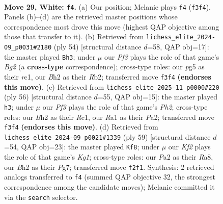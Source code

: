 \documentclass[11pt]{article}
\begin{document}
\clearpage

\begin{figure}[p]\centering
\begin{subfigure}{0.46\textwidth}\centering
\resizebox{\linewidth}{!}{%
\newchessgame
\chessboard[
  setfen={2rb2nr/p4k1p/2p5/6p1/8/3B1P1P/PPP2KPB/RR6 w - - 2 29},
  showmover=false,
  pgfstyle=straightmove, color=movearrow, markmove={f3-f4}
]}
\caption{}
\end{subfigure}\hfill
\begin{subfigure}{0.46\textwidth}\centering
\resizebox{\linewidth}{!}{%
\newchessgame
\chessboard[
  setfen={4r1k1/p3pp2/3pn1p1/8/8/1P1R2P1/PR2PPBK/2r5 w - - 3 28},
  showmover=false,
  pgfstyle=straightmove, color=movearrow, markmove={g2-h3}
]}
\caption{}
\end{subfigure}
\\[4pt]
\begin{subfigure}{0.46\textwidth}\centering
\resizebox{\linewidth}{!}{%
\newchessgame
\chessboard[
  setfen={4r1k1/8/bp5p/p2r1pp1/8/2B5/PPP2RPP/2R3K1 w - - 0 29},
  showmover=false,
  pgfstyle=straightmove, color=movearrow, markmove={h2-h3}
]}
\caption{}
\end{subfigure}\hfill
\begin{subfigure}{0.46\textwidth}\centering
\resizebox{\linewidth}{!}{%
\newchessgame
\chessboard[
  setfen={r5k1/1p3ppp/p1b1p3/8/2P2P2/8/PP1RB1PP/6K1 b - - 0 30},
  showmover=false,
  pgfstyle=straightmove, color=movearrow, markmove={g8-f8}
]}
\caption{}
\end{subfigure}
\caption{\textbf{Move 29, White: \texttt{f4}.} (a) Our position; Melanie plays \texttt{f4} (\texttt{f3f4}). Panels (b)--(d) are the retrieved master positions whose correspondence most drove this move (highest QAP objective among those that transfer to it). (b) Retrieved from \texttt{lichess\_elite\_2024-09\_p0031\#2180} (ply 54) [structural distance $d$=58, QAP obj=17]: the master played \texttt{Bh3}; under $\mu$ our \emph{Pf3} plays the role of that game's \emph{Bg2} (a \textbf{cross-type} correspondence); cross-type roles: our \emph{p}g5 as their \emph{r}c1, our \emph{B}h2 as their \emph{R}b2; transferred move \texttt{f3f4} \textbf{(endorses this move)}. (c) Retrieved from \texttt{lichess\_elite\_2025-11\_p0000\#220} (ply 56) [structural distance $d$=55, QAP obj=15]: the master played \texttt{h3}; under $\mu$ our \emph{Pf3} plays the role of that game's \emph{Ph2}; cross-type roles: our \emph{B}h2 as their \emph{R}c1, our \emph{R}a1 as their \emph{P}a2; transferred move \texttt{f3f4} \textbf{(endorses this move)}. (d) Retrieved from \texttt{lichess\_elite\_2024-09\_p0021\#1339} (ply 59) [structural distance $d$=54, QAP obj=23]: the master played \texttt{Kf8}; under $\mu$ our \emph{Kf2} plays the role of that game's \emph{Kg1}; cross-type roles: our \emph{P}a2 as their \emph{R}a8, our \emph{B}h2 as their \emph{P}g7; transferred move \texttt{f2f1}. Synthesis: 2 retrieved analogs transferred to \texttt{f4} (summed QAP objective 32, the strongest correspondence among the candidate moves); Melanie committed it via the \texttt{search} selector.}
\label{fig:thought-m56}
\end{figure}
\end{document}
